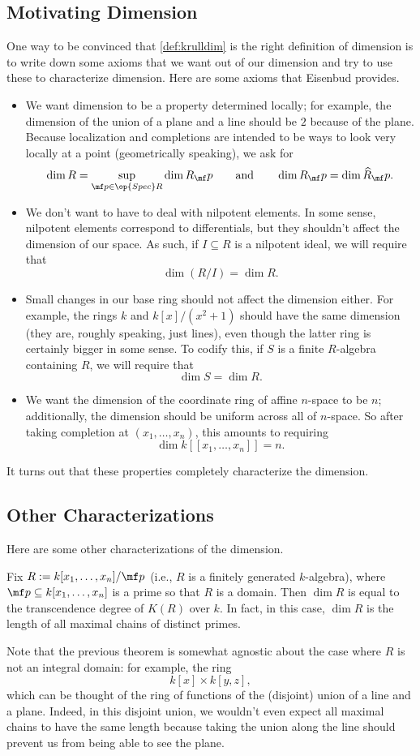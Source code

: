 \subsection{Motivating Dimension}
One way to be convinced that \autoref{def:krulldim} is the right definition of dimension is to write down some axioms that we want out of our dimension and try to use these to characterize dimension. Here are some axioms that Eisenbud provides.
\begin{itemize}
	\item We want dimension to be a property determined locally; for example, the dimension of the union of a plane and a line should be $2$ because of the plane. Because localization and completions are intended to be ways to look very locally at a point (geometrically speaking), we ask for
	\[\dim R=\sup_{\mf p\in\op{Spec}R}\dim R_\mf p\qquad\text{and}\qquad\dim R_\mf p=\dim\widehat R_\mf p.\]
	\item We don't want to have to deal with nilpotent elements. In some sense, nilpotent elements correspond to differentials, but they shouldn't affect the dimension of our space. As such, if $I\subseteq R$ is a nilpotent ideal, we will require that
	\[\dim(R/I)=\dim R.\]
	\item Small changes in our base ring should not affect the dimension either. For example, the rings $k$ and $k[x]/\left(x^2+1\right)$ should have the same dimension (they are, roughly speaking, just lines), even though the latter ring is certainly bigger in some sense. To codify this, if $S$ is a finite $R$-algebra containing $R$, we will require that
	\[\dim S=\dim R.\]
	\item We want the dimension of the coordinate ring of affine $n$-space to be $n$; additionally, the dimension should be uniform across all of $n$-space. So after taking completion at $(x_1,\ldots,x_n)$, this amounts to requiring
	\[\dim k[[x_1,\ldots,x_n]]=n.\]
\end{itemize}
It turns out that these properties completely characterize the dimension.

\subsection{Other Characterizations}
Here are some other characterizations of the dimension.
\begin{theorem}
	Fix $R:=k[x_1,\ldots,x_n]/\mf p$ (i.e., $R$ is a finitely generated $k$-algebra), where $\mf p\subseteq k[x_1,\ldots,x_n]$ is a prime so that $R$ is a domain. Then $\dim R$ is equal to the transcendence degree of $K(R)$ over $k$. In fact, in this case, $\dim R$ is the length of all maximal chains of distinct primes.
\end{theorem}
Note that the previous theorem is somewhat agnostic about the case where $R$ is not an integral domain: for example, the ring
\[k[x]\times k[y,z],\]
which can be thought of the ring of functions of the (disjoint) union of a line and a plane. Indeed, in this disjoint union, we wouldn't even expect all maximal chains to have the same length because taking the union along the line should prevent us from being able to see the plane.

